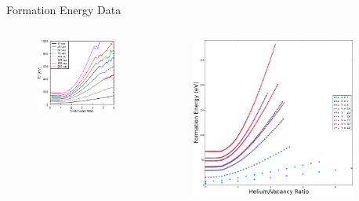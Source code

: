 \documentclass[10pt]{beamer}
\begin{document}
\begin{frame}{Formation Energy Data}
  	\begin{columns}[onlytextwith]
    	\begin{column}{0.5\textwidth}
      		\begin{figure}
        		\includegraphics[width=\textwidth]{formationEnergyBrian}
      		\end{figure}
    	\end{column}  
    	\begin{column}{0.5\textwidth}
      		\begin{figure}
        		\includegraphics[width=0.9\textwidth]{formationEnergySophie}
      		\end{figure}
    	\end{column}
  	\end{columns}
\end{frame}
\end{document}
